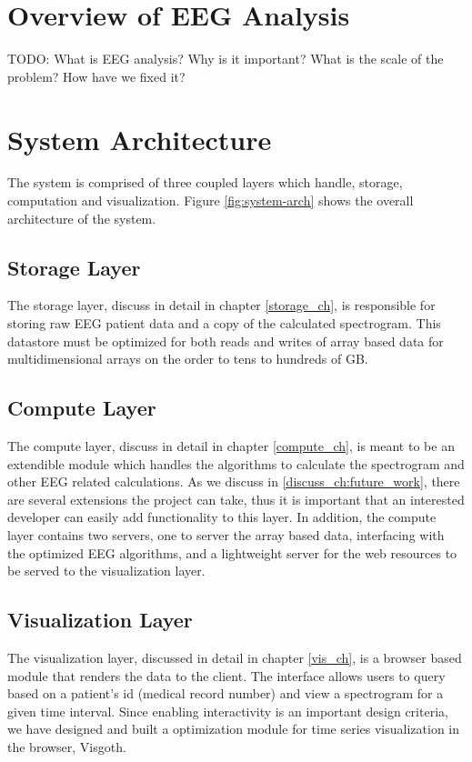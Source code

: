 \section{Overview of EEG Analysis}

TODO:
What is EEG analysis? Why is it important? What is the scale of the problem? How have we fixed it?

\section{System Architecture}

The system is comprised of three coupled layers which handle, storage,
computation and visualization. Figure \ref{fig:system-arch} shows the overall
architecture of the system.

\subsection{Storage Layer}

The storage layer, discuss in detail in chapter \ref{storage_ch}, is responsible for
storing raw EEG patient data and a copy of the calculated spectrogram. This
datastore must be optimized for both reads and writes of array based data for
multidimensional arrays on the order to tens to hundreds of GB.

\subsection{Compute Layer}

The compute layer, discuss in detail in chapter \ref{compute_ch}, is meant to be an
extendible module which handles the algorithms to calculate the spectrogram and
other EEG related calculations. As we discuss in \ref{discuss_ch:future_work},
there are several extensions the project can take, thus it is important that an
interested developer can easily add functionality to this layer. In addition,
the compute layer contains two servers, one to server the array based data,
interfacing with the optimized EEG algorithms, and a lightweight server for the
web resources to be served to the visualization layer.

\subsection{Visualization Layer}

The visualization layer, discussed in detail in chapter \ref{vis_ch}, is a browser
based module that renders the data to the client. The interface allows users to
query based on a patient's id (medical record number) and view a spectrogram
for a given time interval. Since enabling interactivity is an important design
criteria, we have designed and built a optimization module for time series
visualization in the browser, Visgoth.

